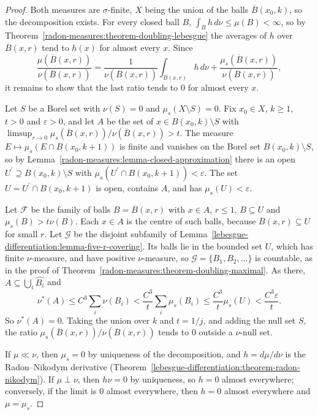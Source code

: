 \begin{proof}
Both measures are $\sigma$-finite, $X$ being the union of the balls $\overline{B}(x_0, k)$, so the decomposition exists. For every closed ball $B$, $\int_Bh\,d\nu \leq \mu(B) < \infty$, so by
Theorem~\ref{radon-measures:theorem-doubling-lebesgue} the averages of $h$ over $\overline{B}(x, r)$ tend to $h(x)$ for almost every $x$. Since
\[
\frac{\mu(\overline{B}(x, r))}{\nu(\overline{B}(x, r))} = \frac{1}{\nu(\overline{B}(x, r))}\int_{\overline{B}(x, r)}h\,d\nu + \frac{\mu_s(\overline{B}(x, r))}{\nu(\overline{B}(x, r))},
\]
it remains to show that the last ratio tends to $0$ for almost every $x$.

Let $S$ be a Borel set with $\nu(S) = 0$ and $\mu_s(X \setminus S) = 0$. Fix $x_0 \in X$, $k \geq 1$, $t > 0$ and $\varepsilon > 0$, and let $A$ be the set of $x \in B(x_0, k) \setminus S$ with
$\limsup_{r \to 0}\mu_s(\overline{B}(x, r))/\nu(\overline{B}(x, r)) > t$. The measure $E \mapsto \mu_s(E \cap B(x_0, k + 1))$ is finite and vanishes on the Borel set $B(x_0, k) \setminus S$, so by
Lemma~\ref{radon-measures:lemma-closed-approximation} there is an open $U^{\prime} \supseteq B(x_0, k) \setminus S$ with $\mu_s(U^{\prime} \cap B(x_0, k + 1)) < \varepsilon$. The set $U = U^{\prime} \cap B(x_0, k + 1)$ is
open, contains $A$, and has $\mu_s(U) < \varepsilon$.

Let $\mathcal{F}$ be the family of balls $B = \overline{B}(x, r)$ with $x \in A$, $r \leq 1$, $B \subseteq U$ and $\mu_s(B) > t\nu(B)$. Each $x \in A$ is the centre of such balls, because
$\overline{B}(x, r) \subseteq U$ for small $r$. Let $\mathcal{G}$ be the disjoint subfamily of Lemma~\ref{lebesgue-differentiation:lemma-five-r-covering}. Its balls lie in the bounded set $U$, which has finite
$\nu$-measure, and have positive $\nu$-measure, so $\mathcal{G} = \{B_1, B_2, \ldots\}$ is countable, as in the proof of Theorem~\ref{radon-measures:theorem-doubling-maximal}. As there,
$A \subseteq \bigcup_i\widehat{B_i}$ and
\[
\nu^*(A) \leq C^3\sum_i\nu(B_i) < \frac{C^3}{t}\sum_i\mu_s(B_i) \leq \frac{C^3}{t}\mu_s(U) < \frac{C^3\varepsilon}{t} .
\]
So $\nu^*(A) = 0$. Taking the union over $k$ and $t = 1/j$, and adding the null set $S$, the ratio $\mu_s(\overline{B}(x, r))/\nu(\overline{B}(x, r))$ tends to $0$ outside a $\nu$-null set.

If $\mu \ll \nu$, then $\mu_s = 0$ by uniqueness of the decomposition, and $h = d\mu/d\nu$ is the Radon--Nikodym derivative (Theorem~\ref{lebesgue-differentiation:theorem-radon-nikodym}). If $\mu \perp \nu$, then
$h\nu = 0$ by uniqueness, so $h = 0$ almost everywhere; conversely, if the limit is $0$ almost everywhere, then $h = 0$ almost everywhere and $\mu = \mu_s$.
\end{proof}

